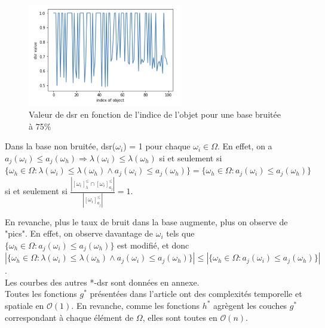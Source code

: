 \documentclass[a4paper]{article}
\begin{document}
\begin{figure}[H]
	\center 
	\includegraphics[width=0.6\textwidth]{images/dsr_75.png}
    \caption{Valeur de dsr en fonction de l'indice de l'objet pour une base
    bruitée à 75\%}
    \label{img:dsr75}
\end{figure}


Dans la base non bruitée, dsr($\omega_i$) = 1 pour chaque $\omega_i \in \Omega$.
En effet, on a $a_j(\omega_i) \leq a_j(\omega_h) \Rightarrow \lambda(\omega_i)
\leq \lambda(\omega_h)$ si et seulement si $\{\omega_h \in \Omega :
\lambda(\omega_i) \leq \lambda(\omega_h) \land a_j(\omega_i) \leq
a_j(\omega_h)\} = \{\omega_h \in \Omega : a_j(\omega_i) \leq a_j(\omega_h)\}$ si
et seulement si $\frac{| [\omega_i]^{\leq}_{\lambda} \cap
[\omega_i]^{\leq}_{a_j}|}{| [\omega_i]^{\leq}_{a_j} |} = 1 $.

\noindent En revanche, plus le taux de bruit dans la base augmente, plus on observe de
"pics". En effet, on observe davantage de $\omega_i$ tels que $ \{\omega_h \in
\Omega : a_j(\omega_i) \leq a_j(\omega_h)\} $ est modifié, et donc  $|
\{\omega_h \in \Omega : \lambda(\omega_i) \leq \lambda(\omega_h) \land
a_j(\omega_i) \leq a_j(\omega_h)\} | \leq | \{\omega_h \in \Omega :
a_j(\omega_i) \leq a_j(\omega_h)\} |$. \\

\noindent Les courbes des autres *-dsr sont données en annexe.\\

Toutes les fonctions $g^*$ présentées dans l'article ont des complexités
temporelle et spatiale en $\mathcal{O}(1)$. En revanche, comme les fonctions
$h^*$ agrègent les couches $g^*$ correspondant à chaque élément de $\Omega$,
elles sont toutes en $\mathcal{O}(n)$.   
\end{document}
